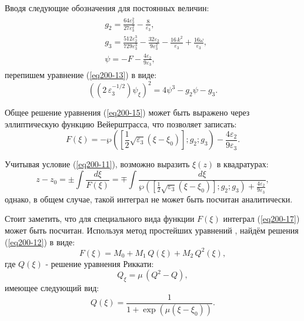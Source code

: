 \documentclass[12pt,a4paper]{article}
\begin{document}
	Вводя следующие обозначения для постоянных величин:
	\begin{equation} \label{eq200-14}
		\begin{aligned}
			\begin{split}
			&g_{2}=\frac{64 \varepsilon_{2}^{2}}{27 \varepsilon_{3}^{2}}-\frac{8 }{\varepsilon_{3}},\\
			&g_{3}=\frac{512 \varepsilon_{2}^{3}}{729 \varepsilon_{3}^{3}}
			-\frac{32 \varepsilon_{2}}{9 \varepsilon_{3}^{2}}
			-\frac{16 \,k^{2}}{\varepsilon_{3}}
			+\frac{16 \omega}{\varepsilon_{3}},\\
			&\psi=-F-\frac{4 \varepsilon_{2}}{9 \varepsilon_{3}},
			\end{split}
		\end{aligned}
	\end{equation}
	перепишем уравнение (\ref{eq200-13}) в виде:
	\begin{equation}\label{eq200-15}
		\left(\left(2\,\varepsilon_{3}^{-1/2}\right)\psi_{\xi}\right)^{2}=4 \psi^{3}-g_{2} \psi-g_{3}.
	\end{equation}

	Общее решение уравнения (\ref{eq200-15}) может быть выражено через эллиптическую функцию Вейерштрасса, что позволяет записать:
	\begin{equation}\label{eq200-16}
		F(\xi)=-\wp\left(\left[\frac{1}{2}\sqrt{\varepsilon_{3}}\left(\xi-\xi_{0}\right)\right];g_{2};g_{3}\right)-\frac{4 \varepsilon_{2}}{9 \varepsilon_{3}}.
	\end{equation}

	Учитывая условие (\ref{eq200-11}), возможно выразить \(\xi(z)\) в квадратурах: 
	\begin{equation}\label{eq200-17}
		z-z_{0}=\pm\int \frac{d\xi}{F(\xi)}=\mp \int \frac{d\xi}{\wp\left(\left[\frac{1}{2}\sqrt{\varepsilon_{3}}\left(\xi-\xi_{0}\right)\right];g_{2};g_{3}\right) + \frac{4 \varepsilon_{2}}{9 \varepsilon_{3}} },
	\end{equation}
	однако, в общем случае, такой интеграл не может быть посчитан аналитически. 

	Стоит заметить, что для специального вида функции \(F(\xi)\) интеграл (\ref{eq200-17}) может быть посчитан.
	Используя метод простейших уравнений \cite{Rad4}, найдём решения (\ref{eq200-12}) в виде:
	\begin{equation} \label{eq15}
		F(\xi)=M_{0}+M_{1}\,Q(\xi)+M_{2}\,Q^{2}(\xi),
	\end{equation}
	где \(Q(\xi)\) - решение уравнения Риккати:
	\begin{equation}\label{eq16}
		Q_{\xi}=\mu\,(Q^{2}-Q),
	\end{equation}
	имеющее следующий вид:
	\begin{equation}
		Q(\xi)=\frac{1}{1+\exp\left(\mu(\xi-\xi_{0})\right)}.
	\end{equation}
\end{document}
